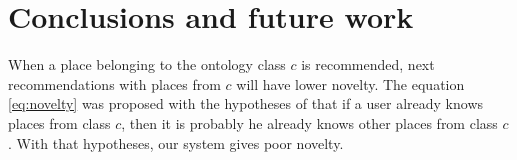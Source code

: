 \section{Conclusions and future work}

When a place belonging to the ontology class $c$ is recommended, next recommendations with places from $c$ will have lower novelty. The equation \ref{eq:novelty} was proposed with the hypotheses of that if a user already knows places from class $c$, then it is probably he already knows other places from class $c$. With that hypotheses, our system gives poor novelty.